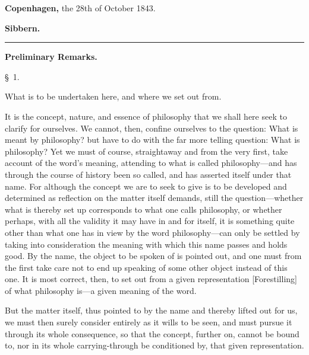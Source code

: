\documentclass[12pt,a4paper]{book}
\newcommand{\grouphead}[1]{%
  \bigskip\begin{center}\large\textbf{#1}\end{center}\smallskip}
\begin{document}
\bigskip
\noindent\textbf{Copenhagen,} the 28th of October 1843.
\nopagebreak
\begin{flushright}\textbf{Sibbern.}\end{flushright}

\begin{center}\rule{0.18\linewidth}{0.4pt}\end{center}

\mainmatter

\grouphead{Preliminary Remarks.}

\begin{center}\large\S~1.\end{center}
\begin{center}What is to be undertaken here, and where we set out from.\end{center}

It is the concept, nature, and essence of philosophy that we shall here seek to
clarify for ourselves. We cannot, then, confine ourselves to the question: What
is meant by philosophy? but have to do with the far more telling question: What
is philosophy? Yet we must of course, straightaway and from the very
first, take account of the word's meaning, attending to what is called
philosophy---and has through the course of history been so called, and has
asserted itself under that name. For although the concept we are to seek to give
is to be developed and determined as reflection on the matter itself demands,
still the question---whether what is thereby set up corresponds to what one
calls philosophy, or whether perhaps, with all the validity it may have in and
for itself, it is something quite other than what one has in view by the word
philosophy---can only be settled by taking into consideration the meaning with
which this name passes and holds good. By the name, the object to be spoken of
is pointed out, and one must from the first take care not to end up speaking of
some other object instead of this one. It is most correct, then, to set out from
a given representation [Forestilling] of what philosophy is---a given meaning of
the word.

But the matter itself, thus pointed to by the name and thereby lifted out for
us, we must then surely consider entirely as it wills to be seen, and must
pursue it through its whole consequence, so that the concept, further on, cannot
be bound to, nor in its whole carrying-through be conditioned by, that given
representation.
\end{document}
